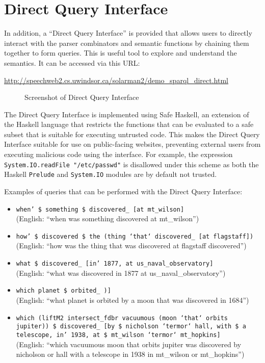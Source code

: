 \documentclass[../main.tex]{subfiles}
\begin{document}

\section{Direct Query Interface}

In addition, a ``Direct Query Interface'' is provided that allows users to directly interact with the parser combinators and semantic functions by chaining them together to form queries.  This is useful tool to explore and understand the semantics.  It can be accessed via this URL:

\url{http://speechweb2.cs.uwindsor.ca/solarman2/demo_sparql_direct.html}

\begin{figure}[h]
	\centering
	\caption{Screenshot of Direct Query Interface}
\end{figure}

The Direct Query Interface is implemented using Safe Haskell\cite{safehaskell}, an extension of the Haskell language that restricts the functions that can be evaluated
to a safe subset that is suitable for executing untrusted code.  This makes the Direct Query Interface suitable for use on public-facing websites, preventing external users from executing malicious code using the interface.  For example, the expression \texttt{System.IO.readFile "/etc/passwd"} is disallowed under this scheme as both the Haskell \texttt{Prelude} and \texttt{System.IO} modules are by default not trusted.

Examples of queries that can be performed with the Direct Query Interface:
\begin{itemize}
	\item \texttt{when' \$ something \$ discovered\_ [at mt\_wilson]} \\(English: ``when was something discovered at mt\_wilson'')
	\item \texttt{how' \$ discovered \$
	\subitem the (thing `that` discovered\_ [at flagstaff])} \\(English: ``how was the thing that was discovered at flagstaff discovered'')
	\item \texttt{what \$ discovered\_ [in' 1877, at us\_naval\_observatory]} \\(English: ``what was discovered in 1877 at us\_naval\_observatory'')
	\item \texttt{which planet \$ orbited\_ 
		\subitem [by \$ a (moon `that` discovered\_ [in' 1684])]} \\(English: ``what planet is orbited by a moon that was discovered in 1684'')
	\item \texttt{which
		\subitem (liftM2 intersect\_fdbr vacuumous  (moon `that` orbits jupiter))
		\subitem \$ discovered\_ [by \$ nicholson `termor` hall, \subsubitem with \$ a telescope, in' 1938, \subsubitem at \$ mt\_wilson `termor` mt\_hopkins]}\\(English: ``which vacuumous moon that orbits jupiter was discovered by nicholson or hall with a telescope in 1938 in mt\_wilson or mt\_hopkins'')
\end{itemize}
\end{document}
